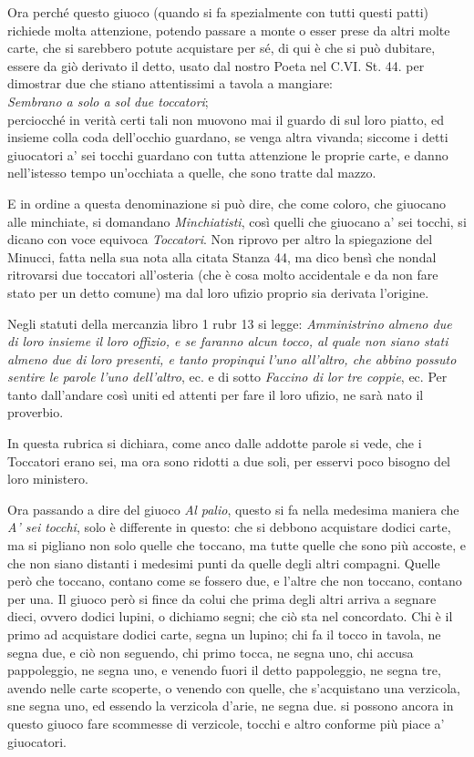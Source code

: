 \documentclass[11pt,a5paper]{article}
\begin{document}
Ora perché questo giuoco (quando si fa spezialmente con tutti questi patti)
richiede molta attenzione, potendo passare a monte o esser prese da altri
molte carte, che si sarebbero potute acquistare per sé, di qui è che si può
dubitare, essere da giò derivato il detto, usato dal nostro Poeta nel
C.VI. St. 44. per dimostrar due che stiano attentissimi a tavola a
mangiare:\\
\textit{Sembrano a solo a sol due toccatori};\\
perciocché in
verità certi tali non muovono mai il guardo di sul loro piatto, ed insieme
colla coda dell'occhio guardano, se venga altra vivanda; siccome i detti
giuocatori a' sei tocchi guardano con tutta attenzione le proprie carte, e
danno nell'istesso tempo un'occhiata a quelle, che sono tratte dal mazzo.

E in ordine a questa denominazione si può dire, che come coloro, che
giuocano alle minchiate, si domandano \textit{Minchiatisti}, così quelli che
giuocano a' sei tocchi, si dicano con voce equivoca \textit{Toccatori}.  Non
riprovo per altro la spiegazione del Minucci, fatta nella sua nota alla
citata Stanza 44, ma dico bensì che nondal ritrovarsi due toccatori
all'osteria (che è cosa molto accidentale e da non fare stato per un detto
comune) ma dal loro ufizio proprio sia derivata l'origine.

Negli statuti della mercanzia libro 1 rubr 13 si legge: \textit{Amministrino
  almeno due di loro insieme il loro offizio, e se faranno alcun tocco, al
  quale non siano stati almeno due di loro presenti, e tanto propinqui l'uno
  all'altro, che abbino possuto sentire le parole l'uno dell'altro}, ec. e
di sotto \textit{Faccino di lor tre coppie}, ec. Per tanto dall'andare così
uniti ed attenti per fare il loro ufizio, ne sarà nato il proverbio.

In questa rubrica si dichiara, come anco dalle addotte parole si vede, che i Toccatori erano sei, ma ora sono ridotti a due soli, per esservi poco bisogno del loro ministero.

Ora passando a dire del giuoco \textit{Al palio}, questo si fa nella
medesima maniera che \textit{A' sei tocchi}, solo è differente in questo:
che si debbono acquistare dodici carte, ma si pigliano non solo quelle che
toccano, ma tutte quelle che sono più accoste, e che non siano distanti i
medesimi punti da quelle degli altri compagni. Quelle però che toccano,
contano come se fossero due, e l'altre che non toccano, contano per una.  Il
giuoco però si fince da colui che prima degli altri arriva a segnare dieci,
ovvero dodici lupini, o dichiamo segni; che ciò sta nel concordato.  Chi è
il primo ad acquistare dodici carte, segna un lupino; chi fa il tocco in
tavola, ne segna due, e ciò non seguendo, chi primo tocca, ne segna uno, chi
accusa pappoleggio, ne segna uno, e venendo fuori il detto pappoleggio, ne
segna tre, avendo nelle carte scoperte, o venendo con quelle, che
s'acquistano una verzicola, sne segna uno, ed essendo la verzicola d'arie,
ne segna due. si possono ancora in questo giuoco fare scommesse di
verzicole, tocchi e altro conforme più piace a' giuocatori.
\end{document}
